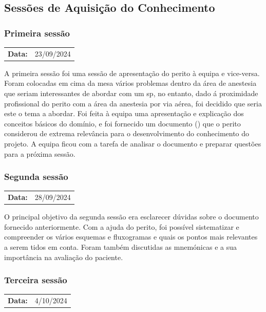 \documentclass[a4paper,12pt,twoside]{article}
\begin{document}
    \subsection{Sessões de Aquisição do Conhecimento}
    \subsubsection{Primeira sessão}
    \begin{tabularx}{0.6\textwidth}{@{}lX@{}}
        \textbf{Data:} & 23/09/2024 \\
    \end{tabularx}

    A primeira sessão foi uma sessão de apresentação do perito à equipa e vice-versa. Foram colocadas em cima da mesa vários problemas dentro da área de anestesia que seriam interessantes de abordar com um \gls{sp}, no entanto, dado á proximidade profissional do perito com a área da anestesia por via aérea, foi decidido que seria este o tema a abordar. Foi feita à equipa uma apresentação e explicação dos conceitos básicos do domínio, e foi fornecido um documento (\cite{consensosva}) que o perito considerou de extrema relevância para o desenvolvimento do conhecimento do projeto. A equipa ficou com a tarefa de analisar o documento e preparar questões para a próxima sessão.

    \subsubsection{Segunda sessão}
    \begin{tabularx}{0.5\textwidth}{@{}lX@{}}
        \textbf{Data:} & 28/09/2024 \\
    \end{tabularx}

    O principal objetivo da segunda sessão era esclarecer dúvidas sobre o documento fornecido anteriormente. Com a ajuda do perito, foi possível sistematizar e compreender os vários esquemas e fluxogramas e quais os pontos mais relevantes a serem tidos em conta. Foram também discutidas as mnemónicas e a sua importância na avaliação do paciente.

    \subsubsection{Terceira sessão}
    \begin{tabularx}{0.5\textwidth}{@{}lX@{}}
        \textbf{Data:} & 4/10/2024 \\
    \end{tabularx}
\end{document}
